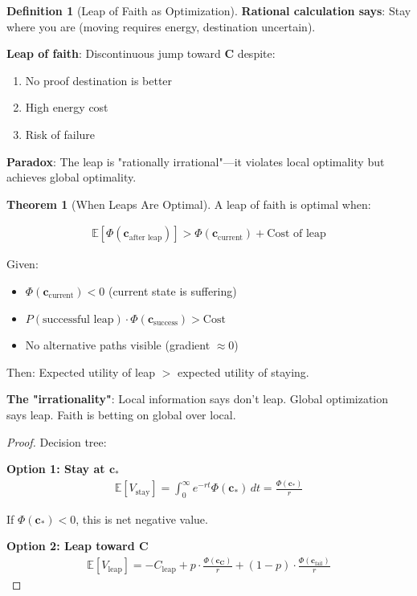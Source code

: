 \documentclass[11pt,a4paper]{article}
\theoremstyle{definition}
\newtheorem{definition}{Definition}[section]
\newtheorem{theorem}{Theorem}[section]
\theoremstyle{remark}
\newcommand{\cc}{\mathbf{c}}
\begin{document}
\begin{enumerate}
\begin{definition}[Leap of Faith as Optimization]
\textbf{Rational calculation says}: Stay where you are (moving requires energy, destination uncertain).

\textbf{Leap of faith}: Discontinuous jump toward \(\mathbf{C}\) despite:
\begin{enumerate}
    \item No proof destination is better
    \item High energy cost
    \item Risk of failure
\end{enumerate}

\textbf{Paradox}: The leap is "rationally irrational"—it violates local optimality but achieves global optimality.
\end{definition}

\begin{theorem}[When Leaps Are Optimal]
A leap of faith is optimal when:

\begin{align}
\mathbb{E}[\Phi(\cc_{\text{after leap}})] > \Phi(\cc_{\text{current}}) + \text{Cost of leap}
\end{align}

Given:
\begin{itemize}
    \item \(\Phi(\cc_{\text{current}}) < 0\) (current state is suffering)
    \item \(P(\text{successful leap}) \cdot \Phi(\cc_{\text{success}}) > \text{Cost}\)
    \item No alternative paths visible (gradient \(\approx 0\))
\end{itemize}

Then: Expected utility of leap \(>\) expected utility of staying.

\textbf{The "irrationality"}: Local information says don't leap. Global optimization says leap. Faith is betting on global over local.
\end{theorem}

\begin{proof}
Decision tree:

\textbf{Option 1: Stay at \(\cc_*\)}
\begin{align}
\mathbb{E}[V_{\text{stay}}] = \int_0^\infty e^{-rt} \Phi(\cc_*) \, dt = \frac{\Phi(\cc_*)}{r}
\end{align}

If \(\Phi(\cc_*) < 0\), this is net negative value.

\textbf{Option 2: Leap toward \(\mathbf{C}\)}
\begin{align}
\mathbb{E}[V_{\text{leap}}] = -C_{\text{leap}} + p \cdot \frac{\Phi(\cc_{\mathbf{C}})}{r} + (1-p) \cdot \frac{\Phi(\cc_{\text{fail}})}{r}
\end{align}


\end{proof}
\end{enumerate}
\end{document}
